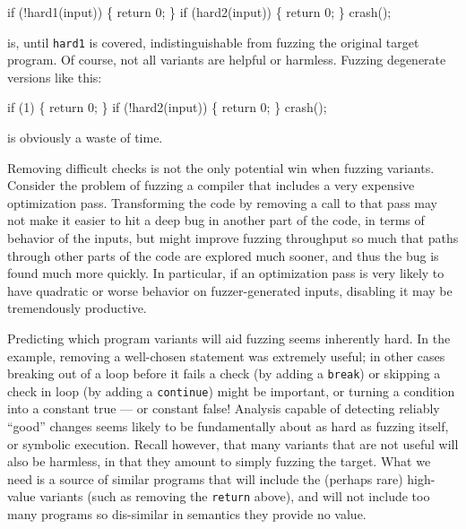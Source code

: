\begin{code}
  if (!hard1(input)) \{
      return 0;
  \}
  if (hard2(input)) \{
      return 0;
  \}
  crash();
\end{code}

\noindent is, until {\tt hard1} is covered, indistinguishable from fuzzing the original target program.  Of course, not all variants are helpful or harmless.  Fuzzing degenerate versions like this:

\begin{code}
  if (1) \{
      return 0;
  \}
  if (!hard2(input)) \{
      return 0;
  \}
  crash();
\end{code}

\noindent is obviously a waste of time.

Removing difficult checks is not the only potential win when fuzzing
variants.  Consider the problem of fuzzing a compiler that includes a
very expensive optimization pass.  Transforming the code by removing a
call to that pass may not make it easier to hit a deep bug in another
part of the code, in terms
of behavior of the inputs, but might improve fuzzing throughput so much
that paths through other parts of the code are explored much sooner,
and thus the bug is found much more quickly.  In particular, if an
optimization pass is very likely to have quadratic or worse behavior
on fuzzer-generated inputs, disabling it may be tremendously productive.

Predicting which program variants will aid fuzzing seems
inherently hard.  In the example, removing a well-chosen statement was
extremely useful; in other cases breaking out of a loop before it
fails a check (by adding  a {\tt break}) or skipping a check in loop
(by adding a {\tt continue}) might be important, or turning a condition into a constant true --- or constant false!  Analysis capable of detecting reliably ``good'' changes seems likely to be fundamentally about as hard as fuzzing itself, or symbolic execution.  Recall however, that many variants that are not useful will also be harmless, in that they amount to simply fuzzing the target.  What we need is a source of similar programs that will include the (perhaps rare) high-value variants (such as removing the {\tt return} above), and will not include too many programs so dis-similar in semantics they provide no value.

